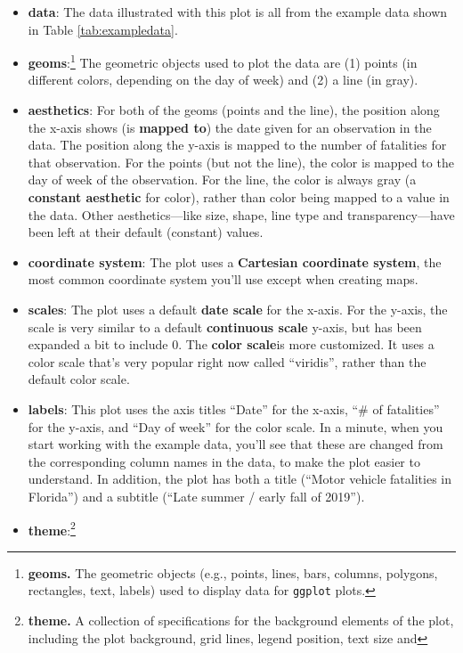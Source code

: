 \documentclass[]{tufte-book}
\providecommand{\tightlist}{%
  \setlength{\itemsep}{0pt}\setlength{\parskip}{0pt}}
\begin{document}
\begin{itemize}
\tightlist
\item
  \textbf{data}: The data illustrated with this plot is all from the example data
  shown in Table \ref{tab:exampledata}.
\item
  \textbf{geoms}:\footnote{\textbf{geoms.} The geometric objects (e.g., points, lines, bars, columns,
    polygons, rectangles, text, labels) used to display data for \texttt{ggplot} plots.}
  The geometric objects used to plot the data are (1) points (in
  different colors, depending on the day of week) and (2) a line (in gray).
\item
  \textbf{aesthetics}: For both of the geoms (points and the line), the position along the
  x-axis shows (is \textbf{mapped to}) the date
  given for an observation in the data. The position along the y-axis is mapped to
  the number of fatalities for that observation. For the points (but not the line),
  the color is mapped to the day of week of the observation. For the line, the color
  is always gray (a \textbf{constant aesthetic} for color), rather than color being mapped
  to a value in the data. Other aesthetics---like size, shape, line type and
  transparency---have been left at their default (constant) values.
\item
  \textbf{coordinate system}: The plot uses a \textbf{Cartesian coordinate system}, the most
  common coordinate system you'll use except when creating maps.
\item
  \textbf{scales}: The plot uses a default \textbf{date scale} for the x-axis. For the y-axis,
  the scale is very similar to a default
  \textbf{continuous scale} y-axis, but has been expanded a bit to include 0.
  The \textbf{color scale}is more customized. It uses
  a color scale that's very popular right now called ``viridis'', rather than the
  default color scale.
\item
  \textbf{labels}: This plot uses the axis titles ``Date'' for the x-axis, ``\# of fatalities''
  for the y-axis, and ``Day of week'' for the color scale. In a minute, when you start
  working with the example data, you'll see that these are changed from the corresponding
  column names in the data, to make the plot easier to understand. In addition,
  the plot has both a title (``Motor vehicle fatalities in Florida'') and a
  subtitle (``Late summer / early fall of 2019'').
\item
  \textbf{theme}:\footnote{\textbf{theme.} A collection of specifications for the background elements
    of the plot, including the plot background, grid lines, legend position, text size and
}
\end{itemize}
\end{document}
